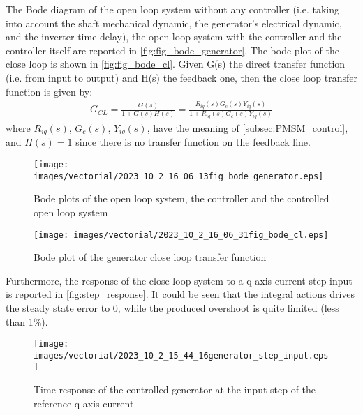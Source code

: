  The Bode diagram of the open loop system without any controller (i.e. taking into account the shaft mechanical dynamic, the generator's electrical dynamic, and the inverter time delay), the open loop system with the controller and the controller itself are reported in \autoref{fig:fig_bode_generator}. The bode plot of the close loop is shown in \autoref{fig:fig_bode_cl}. Given G(s) the direct transfer function (i.e. from input to output) and H(s) the feedback one, then the close loop transfer function is given by:
 \begin{gather}
     G_{CL}=\frac{G(s)}{1+G(s)H(s)}=\frac{R_{iq}(s)G_c(s)Y_{iq}(s)}{1+R_{iq}(s)G_c(s)Y_{iq}(s)}
     \label{eq:close_loop_TF}
 \end{gather}
 where $R_{iq}(s)$, $G_c(s)$, $Y_{iq}(s)$, have the meaning of \autoref{subsec:PMSM_control}, and $H(s)=1$ since there is no transfer function on the feedback line.
 
\begin{figure}[htb]
    \centering
    \texttt{[image: images/vectorial/2023\_10\_2\_16\_06\_13fig\_bode\_generator.eps]}
    \caption{Bode plots of the open loop system, the controller and the controlled open loop system}
    \label{fig:fig_bode_generator}
 \end{figure}

 \begin{figure}[htb]
    \centering
    \texttt{[image: images/vectorial/2023\_10\_2\_16\_06\_31fig\_bode\_cl.eps]}
    \caption{Bode plot of the generator close loop transfer function}
    \label{fig:fig_bode_cl}
 \end{figure}

Furthermore, the response of the close loop system to a q-axis current step input is reported in \autoref{fig:step_response}. It could be seen that the integral actions drives the steady state error to 0, while the produced overshoot is quite limited (less than 1\%). 

\begin{figure}[htb]
  \centering
  \texttt{[image: images/vectorial/2023\_10\_2\_15\_44\_16generator\_step\_input.eps]}
  \caption{Time response of the controlled generator at the input step of the reference q-axis current}
  \label{fig:step_response}
\end{figure}

